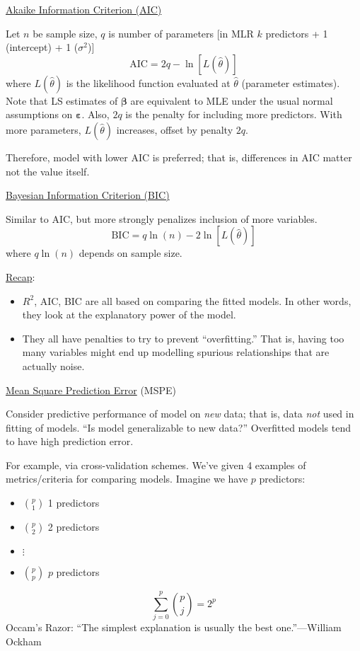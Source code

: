 \underline{Akaike Information Criterion (AIC)}

Let $ n $ be sample size, $ q $ is number of parameters
      [in MLR $ k $ predictors + 1 (intercept) + 1 ($ \sigma^2 $)]
\[ \text{AIC}=2q-\ln[L(\hat{\theta})] \]
where $ L(\hat{\theta}) $ is the likelihood function evaluated
at $ \hat{\theta} $ (parameter estimates). Note that
LS estimates of $ \symbf{\beta} $ are equivalent to MLE
under the usual normal assumptions on $ \symbf{\varepsilon} $.
Also, $ 2q $ is the penalty for including more predictors.
With more parameters, $ L(\hat{\theta}) $
increases, offset by penalty $ 2q $.

Therefore, model with lower AIC is preferred; that is,
differences in AIC matter not the value itself.

\underline{Bayesian Information Criterion (BIC)}

Similar to AIC, but more strongly penalizes
inclusion of more variables.
\[ \text{BIC}=q\ln(n)-2\ln[L(\hat{\theta})] \]
where $ q\ln(n) $ depends on sample size.

\underline{Recap}:
\begin{itemize}
      \item $ R^2 $, AIC, BIC
            are all based on comparing the fitted models.
            In other words, they look at the explanatory power of
            the model.
      \item They all have penalties to try to prevent
            ``overfitting.'' That is, having too many
            variables might end up modelling
            spurious relationships that are actually
            noise.
\end{itemize}

\underline{Mean Square Prediction Error} (MSPE)

Consider predictive performance of model on \emph{new}
data; that is, data \emph{not} used in fitting
of models. ``Is model generalizable to new data?''
Overfitted models tend to have high prediction error.

For example, via cross-validation schemes.
We've given 4 examples of metrics/criteria for comparing
models. Imagine we have $ p $ predictors:
\begin{itemize}
      \item $ \binom{p}{1} $ 1 predictors
      \item $ \binom{p}{2} $ 2 predictors
      \item $ \vdots $
      \item $ \binom{p}{p} $ $ p $ predictors
\end{itemize}
\[ \sum_{j=0}^{p}\binom{p}{j}=2^p \]
Occam's Razor: ``The simplest explanation is
usually the best one.''---William Ockham
